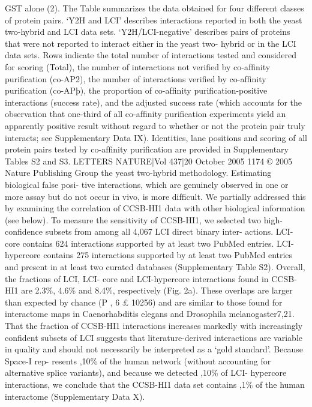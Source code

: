 GST alone (2). The Table summarizes the data obtained for four different
classes of protein pairs. ‘Y2H and LCI’ describes interactions reported in
both the yeast two-hybrid and LCI data sets. ‘Y2H/LCI-negative’ describes
pairs of proteins that were not reported to interact either in the yeast two-
hybrid or in the LCI data sets. Rows indicate the total number of interactions
tested and considered for scoring (Total), the number of interactions not
veriﬁed by co-afﬁnity puriﬁcation (co-AP2), the number of interactions
veriﬁed by co-afﬁnity puriﬁcation (co-APþ), the proportion of co-afﬁnity
puriﬁcation-positive interactions (success rate), and the adjusted success
rate (which accounts for the observation that one-third of all co-afﬁnity
puriﬁcation experiments yield an apparently positive result without regard
to whether or not the protein pair truly interacts; see Supplementary Data
IX). Identities, lane positions and scoring of all protein pairs tested by
co-afﬁnity puriﬁcation are provided in Supplementary Tables S2 and S3.
LETTERS
NATURE|Vol 437|20 October 2005
1174
© 2005 Nature Publishing Group
the yeast two-hybrid methodology. Estimating biological false posi-
tive interactions, which are genuinely observed in one or more assay
but do not occur in vivo, is more difﬁcult. We partially addressed this
by examining the correlation of CCSB-HI1 data with other biological
information (see below).
To measure the sensitivity of CCSB-HI1, we selected two high-
conﬁdence subsets from among all 4,067 LCI direct binary inter-
actions. LCI-core contains 624 interactions supported by at least two
PubMed entries. LCI-hypercore contains 275 interactions supported
by at least two PubMed entries and present in at least two curated
databases (Supplementary Table S2). Overall, the fractions of LCI, LCI-
core and LCI-hypercore interactions found in CCSB-HI1 are 2.3\%,
4.6\% and 8.4\%, respectively (Fig. 2a). These overlaps are larger than
expected by chance (P , 6 £ 10256) and are similar to those found
for interactome maps in Caenorhabditis elegans and Drosophila
melanogaster7,21. That the fraction of CCSB-HI1 interactions increases
markedly with increasingly conﬁdent subsets of LCI suggests that
literature-derived interactions are variable in quality and should not
necessarily be interpreted as a ‘gold standard’. Because Space-I rep-
resents ,10\% of the human network (without accounting for
alternative splice variants), and because we detected ,10\% of LCI-
hypercore interactions, we conclude that the CCSB-HI1 data set
contains ,1\% of the human interactome (Supplementary Data X).

